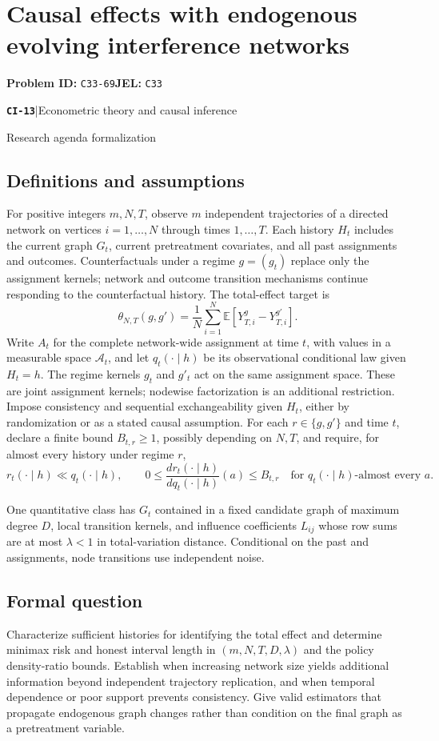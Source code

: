 \documentclass[11pt,a4paper]{article}
\newcommand{\E}{\mathbb E}
\newcommand{\entrymeta}[3]{{\sffamily\small\color{muted}\textbf{\texttt{#1}}\quad|\quad #2\par #3\par}}
\begin{document}
\section*{Causal effects with endogenous evolving interference networks}
\textbf{Problem ID:} \texttt{C33-69}\quad \textbf{JEL:} \texttt{C33}\par
\label{problem:OP-0492}
\label{beyond:CI-13}
\entrymeta{CI-13}{Econometric theory and causal inference}{Research agenda formalization}
\subsection*{Definitions and assumptions}
For positive integers $m,N,T$, observe $m$ independent trajectories of a directed network on vertices $i=1,\ldots,N$ through times $1,\ldots,T$. Each history $H_t$ includes the current graph $G_t$, current pretreatment covariates, and all past assignments and outcomes. Counterfactuals under a regime $g=(g_t)$ replace only the assignment kernels; network and outcome transition mechanisms continue responding to the counterfactual history. The total-effect target is
\[
\theta_{N,T}(g,g')=\frac1N\sum_{i=1}^N
 \E[Y_{T,i}^{g}-Y_{T,i}^{g'}].
\]
Write $A_t$ for the complete network-wide assignment at time $t$, with values in a measurable space $\mathcal A_t$, and let $q_t(\cdot\mid h)$ be its observational conditional law given $H_t=h$. The regime kernels $g_t$ and $g'_t$ act on the same assignment space. These are joint assignment kernels; nodewise factorization is an additional restriction. Impose consistency and sequential exchangeability given $H_t$, either by randomization or as a stated causal assumption. For each $r\in\{g,g'\}$ and time $t$, declare a finite bound $B_{t,r}\geq1$, possibly depending on $N,T$, and require, for almost every history under regime $r$,
\[
 r_t(\cdot\mid h)\ll q_t(\cdot\mid h),\qquad
 0\leq\frac{dr_t(\cdot\mid h)}{dq_t(\cdot\mid h)}(a)\leq B_{t,r}
 \quad\text{for }q_t(\cdot\mid h)\text{-almost every }a.
\]

One quantitative class has $G_t$ contained in a fixed candidate graph of maximum degree $D$, local transition kernels, and influence coefficients $L_{ij}$ whose row sums are at most $\lambda<1$ in total-variation distance. Conditional on the past and assignments, node transitions use independent noise.
\subsection*{Formal question}
Characterize sufficient histories for identifying the total effect and determine minimax risk and honest interval length in $(m,N,T,D,\lambda)$ and the policy density-ratio bounds. Establish when increasing network size yields additional information beyond independent trajectory replication, and when temporal dependence or poor support prevents consistency. Give valid estimators that propagate endogenous graph changes rather than condition on the final graph as a pretreatment variable.
\end{document}
